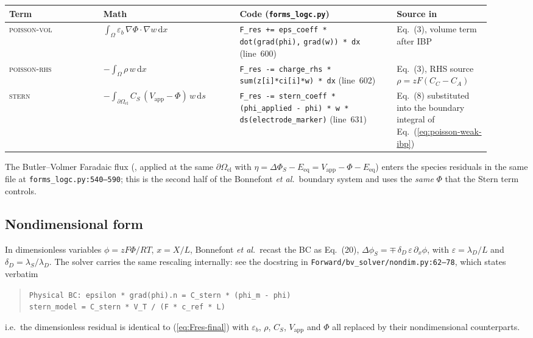 \documentclass[11pt]{article}
\newcommand{\CS}{C_{\!S}}
\newcommand{\dd}{\mathrm{d}}
\newcommand{\eb}{\varepsilon_{b}}
\begin{document}
\begin{center}
\renewcommand{\arraystretch}{1.35}
\begin{tabular}{>{\raggedright\arraybackslash}p{0.18\linewidth}
                >{\raggedright\arraybackslash}p{0.26\linewidth}
                >{\raggedright\arraybackslash}p{0.30\linewidth}
                >{\raggedright\arraybackslash}p{0.18\linewidth}}
\toprule
\textbf{Term} & \textbf{Math} & \textbf{Code (\texttt{forms\_logc.py})} &
\textbf{Source in \cite{bonnefont2001}}\\
\midrule
\textsc{poisson-vol} &
$\displaystyle\int_{\Omega}\eb\,\nabla\Phi\!\cdot\!\nabla w\,\dd x$ &
\texttt{F\_res += eps\_coeff * dot(grad(phi),} \texttt{grad(w)) * dx}
\;\;(line~600) &
Eq.~(3), volume term after IBP \\
\textsc{poisson-rhs} &
$\displaystyle-\!\int_{\Omega}\rho\,w\,\dd x$ &
\texttt{F\_res -= charge\_rhs * sum(z[i]*ci[i]*w) * dx}
\;\;(line~602) &
Eq.~(3), RHS source $\rho = zF(C_{C}-C_{A})$\\
\textsc{stern} &
$\displaystyle -\!\int_{\partial\Omega_{\mathrm{el}}}\!\!
\CS\,(V_{\mathrm{app}}-\Phi)\,w\,\dd s$ &
\texttt{F\_res -= stern\_coeff *} \texttt{(phi\_applied - phi) * w *} \texttt{ds(electrode\_marker)}
\;\;(line~631) &
Eq.~(8) substituted into the boundary integral of
Eq.~(\ref{eq:poisson-weak-ibp})\\
\bottomrule
\end{tabular}
\end{center}

The Butler--Volmer Faradaic flux (\cite[Eq.~(7)]{bonnefont2001},
applied at the same $\partial\Omega_{\mathrm{el}}$ with
$\eta = \Delta\Phi_{S}-E_{\mathrm{eq}} = V_{\mathrm{app}}-\Phi-E_{\mathrm{eq}}$)
enters the species residuals in the same file at
\texttt{forms\_logc.py:540--590}; this is the second half of the
Bonnefont \emph{et al.}~boundary system and uses the
\emph{same} $\Phi$ that the Stern term controls.

\subsection*{Nondimensional form}

In dimensionless variables $\phi=zF\Phi/RT$, $x=X/L$,
Bonnefont \emph{et al.}~recast the BC as Eq.~(20),
$\Delta\phi_{S} = \mp\,\delta_{D}\,\varepsilon\,\partial_{x}\phi$, with
$\varepsilon=\lambda_{D}/L$ and $\delta_{D}=\lambda_{S}/\lambda_{D}$.
The solver carries the same rescaling internally: see the docstring
in \texttt{Forward/bv\_solver/nondim.py:62--78}, which states
verbatim
\begin{quote}
\texttt{Physical BC: epsilon * grad(phi).n = C\_stern * (phi\_m - phi)}\\
\texttt{stern\_model = C\_stern * V\_T / (F * c\_ref * L)\quad[dimensionless]}
\end{quote}
i.e.\ the dimensionless residual is identical to
(\ref{eq:Fres-final}) with $\eb$, $\rho$, $\CS$, $V_{\mathrm{app}}$
and $\Phi$ all replaced by their nondimensional counterparts.
\end{document}
